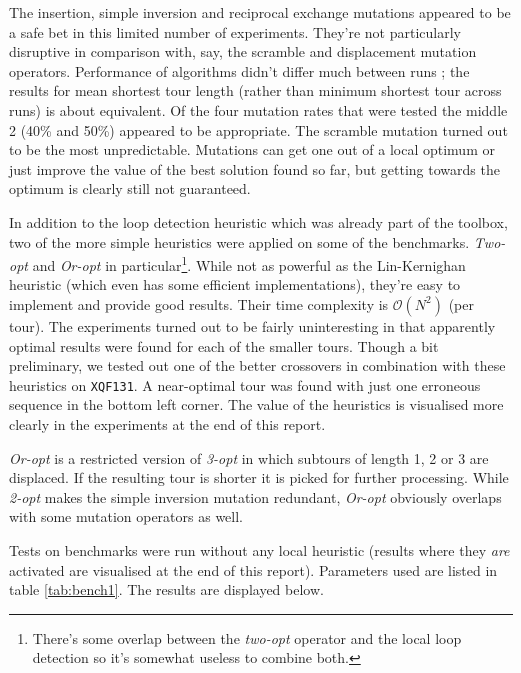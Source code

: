 \noindent The insertion, simple inversion and reciprocal exchange mutations appeared to be a safe bet in this limited number of experiments. They're not particularly disruptive in comparison with, say, the scramble and displacement mutation operators. Performance of algorithms didn't differ much between runs ; the results for mean shortest tour length (rather than minimum shortest tour across runs) is about equivalent. Of the four mutation rates that were tested the middle 2 (40\% and 50\%) appeared to be appropriate. The scramble mutation turned out to be the most unpredictable. Mutations can get one out of a local optimum or just improve the value of the best solution found so far, but getting towards the optimum is clearly still not guaranteed.


In addition to the loop detection heuristic which was already part of the toolbox, two of the more simple heuristics were applied on some of the benchmarks. \textit{Two-opt} and \textit{Or-opt} in particular\footnote{There's some overlap between the \textit{two-opt} operator and the local loop detection so it's somewhat useless to combine both.}. While not as powerful as the Lin-Kernighan heuristic (which even has some efficient implementations), they're easy to implement and provide good results. Their time complexity is $\mathcal{O}(N^2)$ (per tour). The experiments turned out to be fairly uninteresting in that apparently optimal results were found for each of the smaller tours. Though a bit preliminary, we tested out one of the better crossovers in combination with these heuristics on \texttt{XQF131}. A near-optimal tour was found with just one erroneous sequence in the bottom left corner. The value of the heuristics is visualised more clearly in the experiments at the end of this report.\\

\par\noindent \textit{Or-opt} is a restricted version of \textit{3-opt} in which subtours of length 1, 2 or 3 are displaced. If the resulting tour is shorter it is picked for further processing. While \textit{2-opt} makes the simple inversion mutation redundant, \textit{Or-opt} obviously overlaps with some mutation operators as well.


Tests on benchmarks were run without any local heuristic (results where they \textit{are} activated are visualised at the end of this report). Parameters used are listed in table \ref{tab:bench1}. The results are displayed below.

